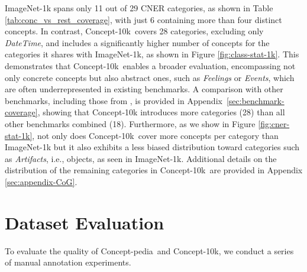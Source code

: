 \documentclass[11pt]{article}
\newcommand{\resource}{Concept-pedia}
\newcommand{\benchmark}{Concept-10k}
\begin{document}
ImageNet-1k spans only 11 out of 29 CNER categories, as shown in Table \ref{tab:conc_vs_rest_coverage}, with just 6 containing more than four distinct concepts. 
In contrast, \benchmark~covers 28 categories, excluding only \textit{DateTime}, and includes a significantly higher number of concepts for the categories it shares with ImageNet-1k, as shown in Figure \ref{fig:class-stat-1k}. 
This demonstrates that \benchmark~enables a broader evaluation, encompassing not only concrete concepts but also abstract ones, such as \textit{Feelings} or \textit{Events}, which are often underrepresented in existing benchmarks.
A comparison with other benchmarks, including those from \citet{radford2021learning}, is provided in Appendix~\ref{sec:benchmark-coverage}, showing that \benchmark{} introduces more categories (28) than all other benchmarks combined (18).
Furthermore, as we show in Figure \ref{fig:cner-stat-1k}, 
not only does \benchmark~cover more concepts per category than ImageNet-1k but it also exhibits a less biased distribution toward categories such as \textit{Artifacts}, i.e., objects, as seen in ImageNet-1k.
Additional details on the distribution of the remaining categories in \benchmark~are provided in Appendix \ref{sec:appendix-CoG}.

% 


\section{Dataset Evaluation}
\label{sec:data_analysis}
To evaluate the quality of \resource~and \benchmark, we conduct a series of manual annotation experiments. %

\end{document}
